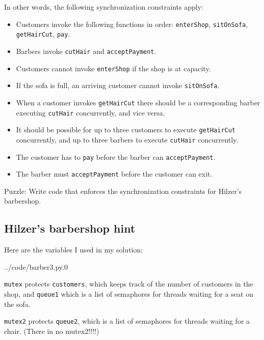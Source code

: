 \documentclass{book}
\begin{document}
In other words, the following synchronization constraints apply:

\begin{itemize}

\item Customers invoke the following functions in order:
{\tt enterShop}, {\tt sitOnSofa},
{\tt getHairCut}, {\tt pay}.

\item Barbers invoke {\tt cutHair} and {\tt acceptPayment}.

\item Customers cannot invoke {\tt enterShop} if the shop
is at capacity.

\item If the sofa is full, an arriving customer cannot invoke 
{\tt sitOnSofa}.

\item When a customer invokes {\tt getHairCut} there should be
a corresponding barber executing {\tt cutHair} concurrently,
and vice versa.

\item It should be possible for up to three customers to execute
{\tt getHairCut} concurrently, and up to three barbers to execute
{\tt cutHair} concurrently.

\item The customer has to {\tt pay} before the barber can
{\tt acceptPayment}.

\item The barber must {\tt acceptPayment} before the customer can
exit.

\end{itemize}

Puzzle: Write code that enforces the synchronization
constraints for Hilzer's barbershop.


\subsection {Hilzer's barbershop hint}

Here are the variables I used in my solution:


{../code/barber3.py.0}

{\tt mutex} protects {\tt customers}, which keeps track of the
number of customers in the shop, and {\tt queue1} which is a list
of semaphores for threads waiting for a seat on the sofa.

{\tt mutex2} protects {\tt queue2}, which is a list
of semaphores for threads waiting for a chair.
(There in no mutex2!!!!)
\end{document}
